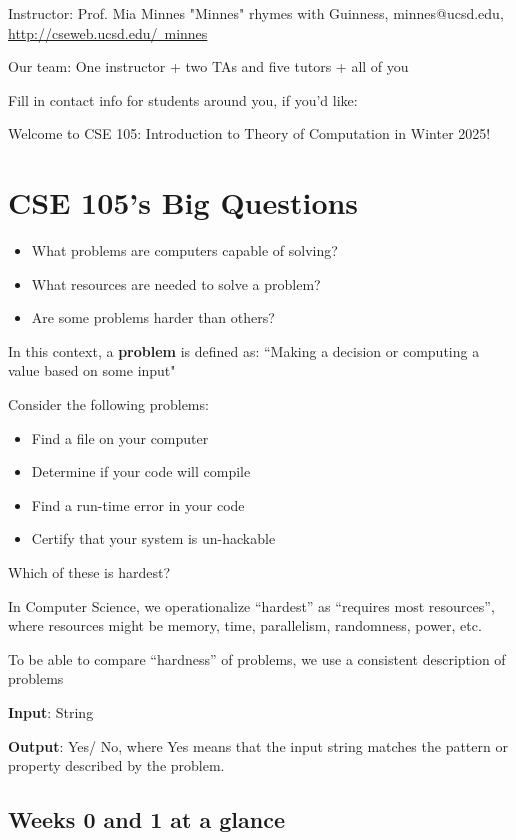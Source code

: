 Instructor: Prof. Mia Minnes {\tiny{"Minnes" rhymes with Guinness}}, minnes@ucsd.edu, 
\href{http://cseweb.ucsd.edu/~minnes}{http://cseweb.ucsd.edu/~minnes}


Our team: One instructor + two TAs and five tutors + all of you

Fill in contact info for students around you, if you'd like:


\vfill

\newpage 
Welcome to CSE 105: Introduction to Theory of Computation in Winter 2025!

\section*{CSE 105's Big Questions}
\begin{itemize}
   \item What problems are computers capable of solving?
   \item What resources are needed to solve a problem?
   \item Are some problems harder than others?
\end{itemize}

In this context, a {\bf problem} is defined as: ``Making a decision or computing a value based on some input"

Consider the following problems: 
\begin{itemize}
   \item Find a file on your computer
   \item Determine if your code will compile
   \item Find a run-time error in your code
   \item Certify that your system is un-hackable
\end{itemize}

Which of these is hardest?

\vfill

In Computer Science, we operationalize ``hardest'' as ``requires most resources'', where
resources might be memory, time, parallelism, randomness, power, etc.

To be able to compare ``hardness'' of problems, we use a consistent description of problems

{\bf Input}: String

{\bf Output}: Yes/ No, where Yes means that the input string matches the pattern or property described by the problem.

\newpage

\subsection*{Weeks 0 and 1 at a glance}

